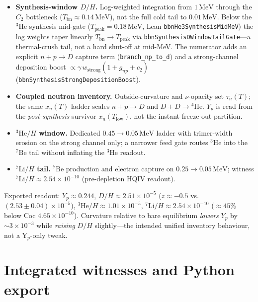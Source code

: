 \documentclass[11pt]{amsart}
\newcommand{\leanid}[1]{\nolinkurl{#1}}
\begin{document}
\begin{itemize}[leftmargin=2em]
\item \textbf{Synthesis-window $D/H$.}
  Log-weighted integration from $1\,\mathrm{MeV}$ through the $C_2$
  bottleneck ($T_{\mathrm{bn}}\approx 0.14\,\mathrm{MeV}$), not the full
  cold tail to $0.01\,\mathrm{MeV}$.  Below the $^3\mathrm{He}$ synthesis mid-gate
  ($T_{\mathrm{peak}}=0.18\,\mathrm{MeV}$, Lean
  \leanid{bbnHe3SynthesisMidMeV}) the log weights taper linearly
  $T_{\mathrm{bn}}\!\to\!T_{\mathrm{peak}}$ via
  \leanid{bbnSynthesisDWindowTailGate}---a thermal-crush tail, not a hard
  shut-off at mid-MeV.  The numerator adds an explicit
  $n\!+\!p\!\to\!D$ capture term (\texttt{branch\_np\_to\_d}) and a strong-channel
  deposition boost $\propto \gamma\,w_{\mathrm{strong}}(1+g_{np}+c_2)$
  (\leanid{bbnSynthesisStrongDepositionBoost}).
\item \textbf{Coupled neutron inventory.}
  Outside-curvature and $\nu$-opacity set $\tau_n(T)$; the same $x_n(T)$
  ladder scales $n\!+\!p\!\to\!D$ and $D\!+\!D\!\to\!{}^4\mathrm{He}$.
  $Y_p$ is read from the \emph{post-synthesis} survivor
  $x_n(T_{\mathrm{low}})$, not the instant freeze-out partition.
\item \textbf{$^3\mathrm{He}/H$ window.}
  Dedicated $0.45\!\to\!0.05\,\mathrm{MeV}$ ladder with trimer-width
  erosion on the strong channel only; a narrower feed gate routes $^3\mathrm{He}$
  into the $^7\mathrm{Be}$ tail without inflating the $^3\mathrm{He}$ readout.
\item \textbf{$^7\mathrm{Li}/H$ tail.}
  $^7\mathrm{Be}$ production and electron capture on
  $0.25\!\to\!0.05\,\mathrm{MeV}$;   witness $^7\mathrm{Li}/H\approx
  2.54\times 10^{-10}$ (pre-depletion HQIV readout).
\end{itemize}

Exported readout: $Y_p\approx 0.244$, $D/H\approx
2.51\times 10^{-5}$ ($z\approx -0.5$ vs.\ $(2.53\pm 0.04)\times 10^{-5}$),
$^3\mathrm{He}/H\approx 1.01\times 10^{-5}$, $^7\mathrm{Li}/H\approx
2.54\times 10^{-10}$ ($\approx 45\%$ below Coc $4.65\times 10^{-10}$).  Curvature relative to bare equilibrium \emph{lowers}
$Y_p$ by $\sim 3\times 10^{-3}$ while \emph{raising} $D/H$ slightly---the
intended unified inventory behaviour, not a Y$_p$-only tweak.

\section{Integrated witnesses and Python export}
\label{sec:integrated}
\end{document}

